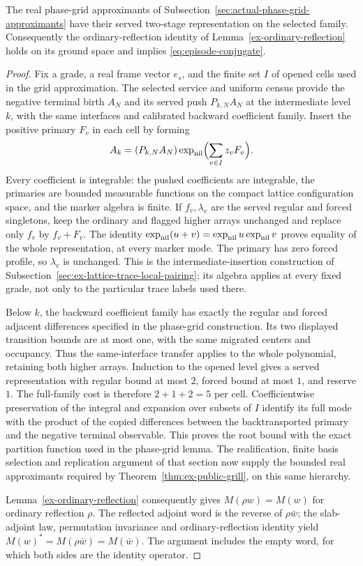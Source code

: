 \begin{lemma}
\label{lem:c14-selected-phase-reflection}
The real phase-grid approximants of
Subsection~\ref{sec:actual-phase-grid-approximants} have their served
two-stage representation on the selected family. Consequently the
ordinary-reflection identity of Lemma~\ref{ex-ordinary-reflection}
holds on its ground space and implies \eqref{eq:episode-conjugate}.
\end{lemma}
\begin{proof}
Fix a grade, a real frame vector $e_s$, and the finite set $I$ of
opened cells used in the grid approximation. The selected service and
uniform census provide the negative terminal birth $A_N$ and its
served push $P_{k,N}A_N$ at the intermediate level $k$, with the same
interfaces and calibrated backward coefficient family. Insert the positive primary
$F_v$ in each cell by forming
\[
 A_k=(P_{k,N}A_N)
             \exp_{\rm nil}\Bigl(\sum_{v\in I}z_vF_v\Bigr).
\]
Every coefficient is integrable: the pushed coefficients are
integrable, the primaries are bounded measurable functions on the
compact lattice configuration space, and the marker algebra is finite.
If $f_v,\lambda_v$ are the served regular and forced singletons, keep
the ordinary and flagged higher arrays unchanged and replace only
$f_v$ by $f_v+F_v$. The identity
$\exp_{\rm nil}(u+v)=\exp_{\rm nil}u\exp_{\rm nil}v$ proves equality
of the whole representation, at every marker mode. The primary has
zero forced profile, so $\lambda_v$ is unchanged. This is the
intermediate-insertion construction of
Subsection~\ref{sec:ex-lattice-trace-local-pairing}; its algebra applies
at every fixed grade, not only to the particular trace labels used
there.

Below $k$, the backward coefficient family has exactly the regular and forced
adjacent differences specified in the phase-grid construction. Its two
displayed transition bounds are at most one, with the same migrated
centers and occupancy. Thus the same-interface transfer applies to the
whole polynomial, retaining both higher arrays. Induction to the
opened level gives a served representation with regular bound at most
$2$, forced bound at most $1$, and reserve $1$. The full-family cost is
therefore $2+1+2=5$ per cell. Coefficientwise preservation of the
integral and expansion over subsets of $I$ identify its full mode
with the product of the copied differences between the backtransported
primary and the negative terminal observable. This proves the root
bound with the exact partition function used in the phase-grid lemma.
The realification, finite basis selection and replication argument of
that section now supply the bounded real approximants required by
Theorem~\ref{thm:ex-public-grill}, on this same hierarchy.

Lemma~\ref{ex-ordinary-reflection} consequently gives
$M(\rho w)=M(w)$ for ordinary reflection $\rho$. The reflected
adjoint word is the reverse of $\rho\bar w$; the slab-adjoint law,
permutation invariance and ordinary-reflection identity yield
$M(w)^*=M(\rho\bar w)=M(\bar w)$. The argument includes the empty
word, for which both sides are the identity operator.
\end{proof}


